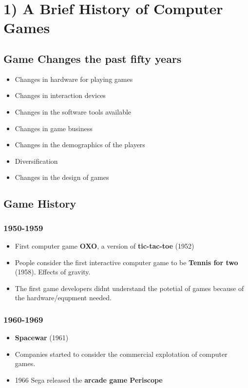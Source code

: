 \chapter*{1) A Brief History of Computer Games}

  \section*{Game Changes the past fifty years}

  \begin{itemize}
    \item Changes in hardware for playing games
    \item Changes in interaction devices
    \item Changes in the software tools available
    \item Changes in game business
    \item Changes in the demographics of the players
    \item Diversification
    \item Changes in the design of games
  \end{itemize}

  \section*{Game History}

  \subsection*{1950-1959}
    \begin{itemize}
      \item First computer game {\bf OXO}, a version of {\bf tic-tac-toe} (1952)
      \item People consider the first interactive computer game to be {\bf Tennis for two} (1958). Effects of gravity.
      \item The first game developers didnt understand the potetial of games because of the hardware/equpment needed.
    \end{itemize}

  \subsection*{1960-1969}
    \begin{itemize}
      \item {\bf Spacewar} (1961)
      \item Companies started to consider the commercial explotation of computer games.
      \item 1966 Sega released the {\bf arcade game Periscope} 
    \end{itemize}

